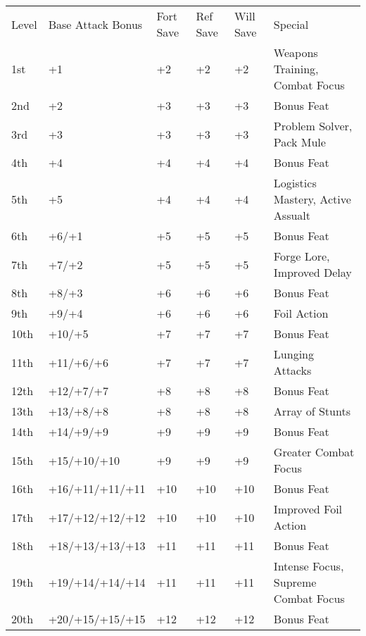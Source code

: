 




\begin{table}[tbh]
\begin{small}
\begin{tabular}{lp{3cm}p{0.7cm}p{0.7cm}p{0.7cm}l}
Level  &Base Attack Bonus &Fort Save &Ref Save &Will Save &Special\\
1st &+1 &+2 &+2 &+2 &Weapons Training, Combat Focus\\
2nd &+2 &+3 &+3 &+3 &Bonus Feat\\
3rd &+3 &+3 &+3 &+3 &Problem Solver, Pack Mule\\
4th &+4 &+4 &+4 &+4 &Bonus Feat\\
5th &+5 &+4 &+4 &+4 &Logistics Mastery, Active Assualt\\
6th &+6/+1 &+5 &+5 &+5 &Bonus Feat\\
7th &+7/+2 &+5 &+5 &+5 &Forge Lore, Improved Delay\\
8th &+8/+3 &+6 &+6 &+6 &Bonus Feat\\
9th &+9/+4 &+6 &+6 &+6 &Foil Action\\
10th &+10/+5 &+7 &+7 &+7 &Bonus Feat\\
11th &+11/+6/+6 &+7 &+7 &+7 &Lunging Attacks\\
12th &+12/+7/+7 &+8 &+8 &+8 &Bonus Feat\\
13th &+13/+8/+8 &+8 &+8 &+8 &Array of Stunts\\
14th &+14/+9/+9 &+9 &+9 &+9 &Bonus Feat\\
15th &+15/+10/+10 &+9 &+9 &+9 &Greater Combat Focus\\
16th &+16/+11/+11/+11 &+10 &+10 &+10 &Bonus Feat\\
17th &+17/+12/+12/+12 &+10 &+10 &+10 &Improved Foil Action\\
18th &+18/+13/+13/+13 &+11 &+11 &+11 &Bonus Feat\\
19th &+19/+14/+14/+14 &+11 &+11 &+11 &Intense Focus, Supreme Combat Focus\\
20th &+20/+15/+15/+15 &+12 &+12 &+12 &Bonus Feat\\
\end{tabular}
\end{small}
\end{table}



